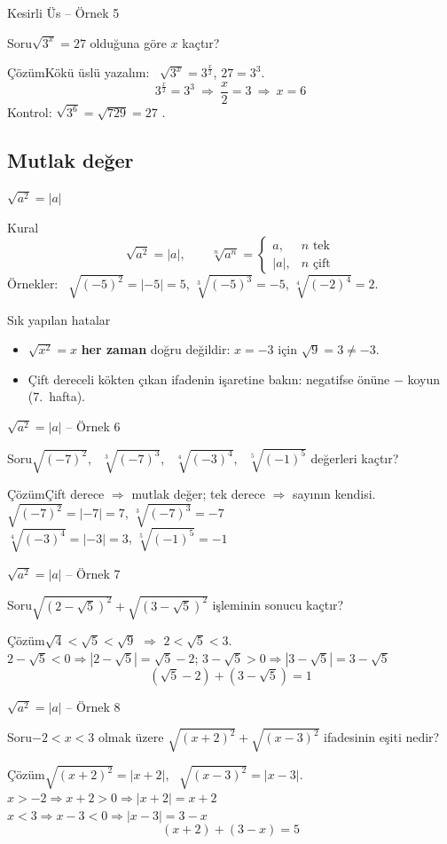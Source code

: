 \documentclass[aspectratio=169,11pt]{beamer}
\newcommand{\soru}[3]{%
\begin{frame}{#1}
  \begin{block}{Soru}\large #2\end{block}
  \pause
  \begin{exampleblock}{Çözüm}\large #3\end{exampleblock}
\end{frame}}
\begin{document}
\soru{Kesirli Üs -- Örnek 5}
{\(\sqrt{3^x}=27\) olduğuna göre \(x\) kaçtır?}
{Kökü üslü yazalım: \ \(\sqrt{3^x}=3^{\frac{x}{2}}\), \quad \(27=3^3\).
\[3^{\frac{x}{2}}=3^3\ \Rightarrow\ \frac{x}{2}=3\ \Rightarrow\ x=6\]
Kontrol: \(\sqrt{3^6}=\sqrt{729}=27\) \checkmark.}

\subsection{Mutlak değer}
\begin{frame}{\(\sqrt{a^2}=|a|\)}
\begin{block}{Kural}
\[\sqrt{a^2}=|a|,\qquad \sqrt[n]{a^n}=\begin{cases}a, & n \text{ tek}\\ |a|, & n \text{ çift}\end{cases}\]
Örnekler: \ \(\sqrt{(-5)^2}=|-5|=5\), \quad \(\sqrt[3]{(-5)^3}=-5\), \quad \(\sqrt[4]{(-2)^4}=2\).
\end{block}
\begin{alertblock}{Sık yapılan hatalar}
\begin{itemize}
\item \(\sqrt{x^2}=x\) \textbf{her zaman} doğru değildir: \(x=-3\) için \(\sqrt{9}=3\neq -3\).
\item Çift dereceli kökten çıkan ifadenin işaretine bakın: negatifse önüne \(-\) koyun (7.~hafta).
\end{itemize}
\end{alertblock}
\end{frame}

\soru{\(\sqrt{a^2}=|a|\) -- Örnek 6}
{\(\sqrt{(-7)^2}\), \ \(\sqrt[3]{(-7)^3}\), \ \(\sqrt[4]{(-3)^4}\), \ \(\sqrt[5]{(-1)^5}\) değerleri kaçtır?}
{Çift derece \(\Rightarrow\) mutlak değer; tek derece \(\Rightarrow\) sayının kendisi.\\[4pt]
\(\sqrt{(-7)^2}=|-7|=7\), \qquad \(\sqrt[3]{(-7)^3}=-7\)\\[4pt]
\(\sqrt[4]{(-3)^4}=|-3|=3\), \qquad \(\sqrt[5]{(-1)^5}=-1\)}

\soru{\(\sqrt{a^2}=|a|\) -- Örnek 7}
{\(\sqrt{(2-\sqrt5)^2}+\sqrt{(3-\sqrt5)^2}\) işleminin sonucu kaçtır?}
{\(\sqrt4<\sqrt5<\sqrt9\) \(\Rightarrow\) \(2<\sqrt5<3\).\\[3pt]
\(2-\sqrt5<0\Rightarrow |2-\sqrt5|=\sqrt5-2\); \qquad \(3-\sqrt5>0\Rightarrow |3-\sqrt5|=3-\sqrt5\)
\[(\sqrt5-2)+(3-\sqrt5)=1\]}

\soru{\(\sqrt{a^2}=|a|\) -- Örnek 8}
{\(-2<x<3\) olmak üzere \(\sqrt{(x+2)^2}+\sqrt{(x-3)^2}\) ifadesinin eşiti nedir?}
{\(\sqrt{(x+2)^2}=|x+2|\), \ \(\sqrt{(x-3)^2}=|x-3|\).\\[3pt]
\(x>-2\Rightarrow x+2>0\Rightarrow |x+2|=x+2\)\\
\(x<3\Rightarrow x-3<0\Rightarrow |x-3|=3-x\)
\[(x+2)+(3-x)=5\]}
\end{document}
